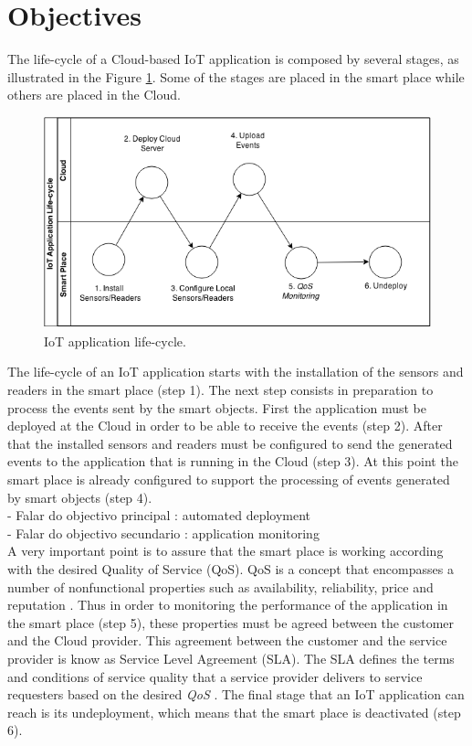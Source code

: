 \section{Objectives}
\label{sec:objectives}
The life-cycle of a Cloud-based IoT application is composed by several stages,
as illustrated in the Figure \ref{fig:life-cycle}. Some of the stages are placed in
the smart place while others are placed in the Cloud.
\begin{figure}[h!]
  \centering
  \includegraphics[width=\textwidth]{./images/life-cycle}
  \caption{IoT application life-cycle.}
  \label{fig:life-cycle}
\end{figure}

The life-cycle of an IoT application starts with the installation of the sensors and
readers in the smart place (step 1). The next step consists in preparation to
process the events sent by the smart objects. First the application must be deployed at
the Cloud in order to be able to receive the events (step 2). After that the installed
sensors and readers must be configured to send the generated events to the application that is
running in the Cloud (step 3). At this point the smart place is already configured to
support the processing of events generated by smart objects (step 4).\\

- Falar do objectivo principal : automated deployment\\
- Falar do objectivo secundario : application monitoring\\

A very important point is to assure that the smart place is working according with the
desired Quality of Service (QoS). QoS is a concept that encompasses a number of nonfunctional
properties such as availability, reliability, price and reputation \cite{o2002s}.
Thus in order to monitoring the performance of the application in the smart place (step 5),
these properties must be agreed between the customer and the Cloud provider.
This agreement between the customer and the service provider is know as Service Level Agreement (SLA).
The SLA defines the terms and conditions of service quality that a service provider delivers
to service requesters based on the desired \textit{QoS} \cite{zeng2004qos}. The final stage
that an IoT application can reach is its undeployment, which means that the smart place is deactivated (step 6).\\

